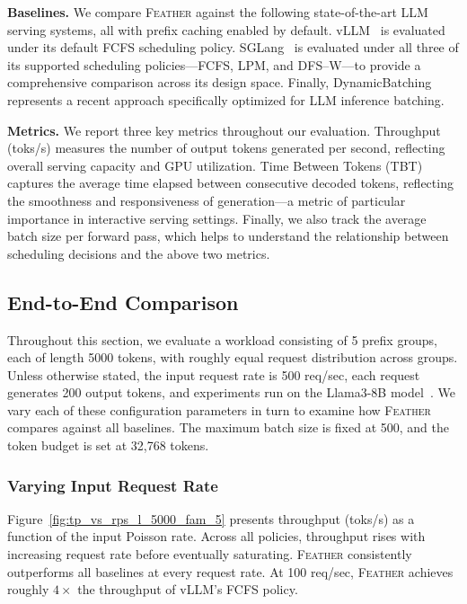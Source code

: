 \textbf{Baselines.}
We compare \textsc{Feather} against the following state-of-the-art LLM serving systems, all with prefix caching enabled by default. vLLM~\cite{kwon2023efficient} is evaluated under its default FCFS scheduling policy. SGLang~\cite{zheng2024sglangefficientexecutionstructured} is evaluated under all three of its supported scheduling policies—FCFS, LPM, and DFS--W—to provide a comprehensive comparison across its design space. Finally, DynamicBatching~\cite{pang2025optimizing} represents a recent approach specifically optimized 
for LLM inference batching.

\textbf{Metrics.}
We report three key metrics throughout our evaluation. Throughput (toks/s) measures the number of output tokens generated per second, reflecting overall serving capacity and GPU utilization. Time Between Tokens (TBT) captures the average time elapsed between consecutive decoded tokens, reflecting the smoothness and responsiveness of generation—a metric of particular importance in interactive serving settings. Finally, we also track the average batch size per forward pass, which helps to understand the relationship between scheduling decisions and the above two metrics.

\subsection{End-to-End Comparison}

Throughout this section, we evaluate a workload consisting of 5 prefix groups, each of length 5000 tokens, with roughly equal request distribution across groups. Unless otherwise stated, the input request rate is 500 req/sec, each request generates 200 output tokens, and experiments run on the Llama3-8B model~\cite{llama3modelcard}. We vary each of these configuration parameters in turn to examine how \textsc{Feather} compares against all baselines. The maximum batch size is fixed at 500, and the token budget is set at 32,768 tokens.

\subsubsection*{Varying Input Request Rate}

Figure~\ref{fig:tp_vs_rps_l_5000_fam_5} presents throughput (toks/s) as a function of the input Poisson rate. Across all policies, throughput rises with increasing request rate before eventually saturating. \textsc{Feather} consistently outperforms all baselines at every request rate. At 100 req/sec, \textsc{Feather} achieves roughly $4\times$ the throughput of vLLM's FCFS policy.

